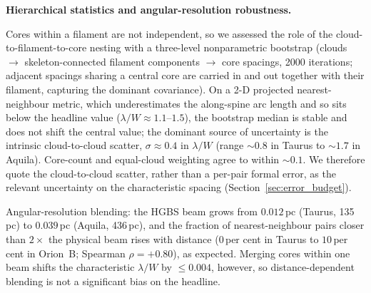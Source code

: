 \documentclass[usenatbib,twoside,twocolumn]{mnras}
\begin{document}
\smallskip\noindent\textbf{Hierarchical statistics and angular-resolution robustness.}

Cores within a filament are not independent, so we assessed the role of the cloud-to-filament-to-core nesting with a three-level nonparametric bootstrap (clouds $\to$ skeleton-connected filament components $\to$ core spacings, 2000 iterations; adjacent spacings sharing a central core are carried in and out together with their filament, capturing the dominant covariance). On a 2-D projected nearest-neighbour metric, which underestimates the along-spine arc length and so sits below the headline value ($\lambda/W\approx1.1$--$1.5$), the bootstrap median is stable and does not shift the central value; the dominant source of uncertainty is the intrinsic cloud-to-cloud scatter, $\sigma\approx0.4$ in $\lambda/W$ (range $\sim0.8$ in Taurus to $\sim1.7$ in Aquila). Core-count and equal-cloud weighting agree to within $\sim0.1$. We therefore quote the cloud-to-cloud scatter, rather than a per-pair formal error, as the relevant uncertainty on the characteristic spacing (Section~\ref{sec:error_budget}).

Angular-resolution blending: the HGBS beam grows from $0.012$\,pc (Taurus, 135\,pc) to $0.039$\,pc (Aquila, 436\,pc), and the fraction of nearest-neighbour pairs closer than $2\times$ the physical beam rises with distance ($0$\,per cent in Taurus to $10$\,per cent in Orion~B; Spearman $\rho=+0.80$), as expected. Merging cores within one beam shifts the characteristic $\lambda/W$ by $\le0.004$, however, so distance-dependent blending is not a significant bias on the headline.
\end{document}
